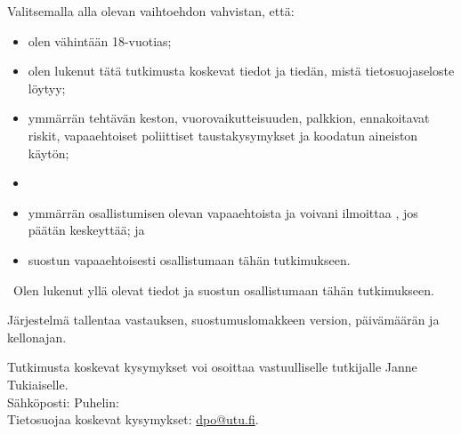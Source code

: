 \begin{infobox}
Valitsemalla alla olevan vaihtoehdon vahvistan, että:
\begin{itemize}[label=\checkbox]
  \item olen vähintään 18-vuotias;
  \item olen lukenut tätä tutkimusta koskevat tiedot ja tiedän, mistä tietosuojaseloste löytyy;
  \item ymmärrän tehtävän keston, vuorovaikutteisuuden, palkkion, ennakoitavat riskit, vapaaehtoiset poliittiset taustakysymykset ja koodatun aineiston käytön;
  \item {}
  \item ymmärrän osallistumisen olevan vapaaehtoista ja voivani ilmoittaa , jos päätän keskeyttää; ja
  \item suostun vapaaehtoisesti osallistumaan tähän tutkimukseen.
\end{itemize}

\medskip
\checkbox\ Olen lukenut yllä olevat tiedot ja suostun osallistumaan tähän tutkimukseen.
\end{infobox}

Järjestelmä tallentaa vastauksen, suostumuslomakkeen version, päivämäärän ja kellonajan.


Tutkimusta koskevat kysymykset voi osoittaa vastuulliselle tutkijalle Janne Tukiaiselle.\\
Sähköposti: \StudyEmail\qquad Puhelin: \StudyPhone\\
Tietosuojaa koskevat kysymykset: \href{mailto:dpo@utu.fi}{dpo@utu.fi}.



